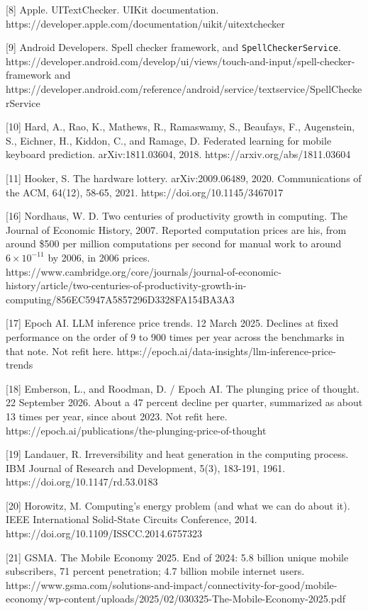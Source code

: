 \documentclass[
  10pt,
]{article}
\begin{document}
{[}8{]} Apple. UITextChecker. UIKit documentation.
https://developer.apple.com/documentation/uikit/uitextchecker

{[}9{]} Android Developers. Spell checker framework, and
\texttt{SpellCheckerService}.
https://developer.android.com/develop/ui/views/touch-and-input/spell-checker-framework
and
https://developer.android.com/reference/android/service/textservice/SpellCheckerService

{[}10{]} Hard, A., Rao, K., Mathews, R., Ramaswamy, S., Beaufays, F.,
Augenstein, S., Eichner, H., Kiddon, C., and Ramage, D. Federated
learning for mobile keyboard prediction. arXiv:1811.03604, 2018.
https://arxiv.org/abs/1811.03604

{[}11{]} Hooker, S. The hardware lottery. arXiv:2009.06489, 2020.
Communications of the ACM, 64(12), 58-65, 2021.
https://doi.org/10.1145/3467017

{[}16{]} Nordhaus, W. D. Two centuries of productivity growth in
computing. The Journal of Economic History, 2007. Reported computation
prices are his, from around \$500 per million computations per second
for manual work to around \(6 \times 10^{-11}\) by 2006, in 2006 prices.
https://www.cambridge.org/core/journals/journal-of-economic-history/article/two-centuries-of-productivity-growth-in-computing/856EC5947A5857296D3328FA154BA3A3

{[}17{]} Epoch AI. LLM inference price trends. 12 March 2025. Declines
at fixed performance on the order of 9 to 900 times per year across the
benchmarks in that note. Not refit here.
https://epoch.ai/data-insights/llm-inference-price-trends

{[}18{]} Emberson, L., and Roodman, D. / Epoch AI. The plunging price of
thought. 22 September 2026. About a 47 percent decline per quarter,
summarized as about 13 times per year, since about 2023. Not refit here.
https://epoch.ai/publications/the-plunging-price-of-thought

{[}19{]} Landauer, R. Irreversibility and heat generation in the
computing process. IBM Journal of Research and Development, 5(3),
183-191, 1961. https://doi.org/10.1147/rd.53.0183

{[}20{]} Horowitz, M. Computing's energy problem (and what we can do
about it). IEEE International Solid-State Circuits Conference, 2014.
https://doi.org/10.1109/ISSCC.2014.6757323

{[}21{]} GSMA. The Mobile Economy 2025. End of 2024: 5.8 billion unique
mobile subscribers, 71 percent penetration; 4.7 billion mobile internet
users.
https://www.gsma.com/solutions-and-impact/connectivity-for-good/mobile-economy/wp-content/uploads/2025/02/030325-The-Mobile-Economy-2025.pdf
\end{document}
